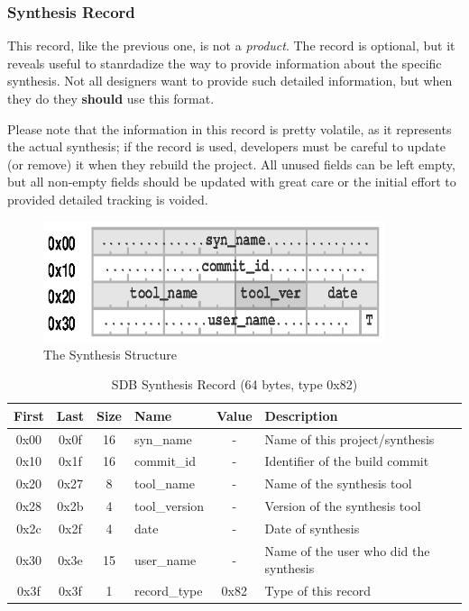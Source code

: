 \documentclass[a4paper, 12pt]{article}
\begin{document}
\pagebreak 

\subsubsection{Synthesis Record}

This record, like the previous one, is not a \textit{product}.
The record is optional, but it reveals
useful to stanrdadize the way to provide information about the specific synthesis.
Not all designers want to provide such detailed information, but when they
do they  \textbf{should} use this format.

Please note that the information in this record is pretty volatile, as
it represents the actual synthesis; if the record is used, developers
must be careful to update (or remove) it when they rebuild the
project.  All unused fields can be left empty, but all non-empty fields should be updated
with great care or the initial effort to provided detailed tracking is voided.

\begin{figure}[h]
\centering%
\includegraphics[width=100mm]{img/sdb-synthesis.ps}
\caption{The Synthesis Structure}
\label{fig:FigureSynthesis}
\end{figure}

\begin{center}
  \begin{savenotes}
    \begin{table}[!ht]\footnotesize
      \caption{SDB Synthesis Record (64 bytes, type 0x82)}\label{sdb_synthesis}\centering
        \begin{tabular}{| c | c | c | l | c | p{5cm} |} \hline
        First & Last & Size & Name & Value & Description \\ \hline
        0x00 & 0x0f & 16 & syn\_name & - & Name of this project/synthesis \\ \hline
        0x10 & 0x1f & 16 & commit\_id & - & Identifier of the build commit \\ \hline
        0x20 & 0x27 & 8 & tool\_name & - & Name of the synthesis tool \\ \hline
        0x28 & 0x2b & 4 & tool\_version & - & Version of the synthesis tool \\ \hline
        0x2c & 0x2f & 4 & date & - & Date of synthesis \\ \hline
        0x30 & 0x3e & 15 & user\_name & - & Name of the user who did the synthesis \\ \hline
        0x3f & 0x3f & 1 & record\_type & 0x82 & Type of this record \\ \hline
        \end{tabular}
    \end{table}
  \end{savenotes}
\end{center}
\end{document}
